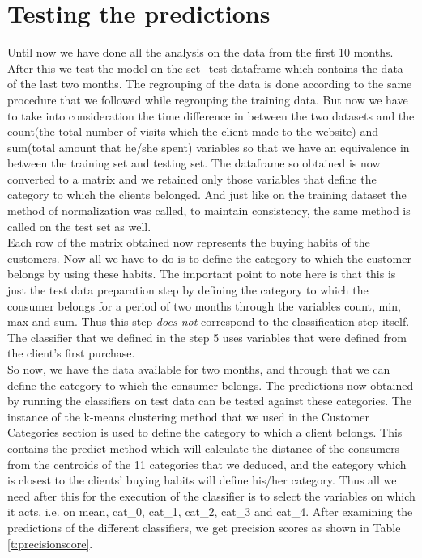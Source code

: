 \section{Testing the predictions}
Until now we have done all the analysis on the data from the first 10 months. After this we test the model on the set\_test dataframe which contains the data of the last two months. The regrouping of the data is done according to the same procedure that we followed while regrouping the training data. But now we have to take into consideration the time difference in between the two datasets and the count(the total number of visits which the client made to the website) and sum(total amount that he/she spent) variables so that we have an equivalence in between the training set and testing set. The dataframe so obtained is now converted to a matrix and we retained only those variables that define the category to which the clients belonged. And just like on the training dataset the method of normalization was called, to maintain consistency, the same method is called on the test set as well.\\
Each row of the matrix obtained now represents the buying habits of the customers. Now all we have to do is to define the category to which the customer belongs by using these habits. The important point to note here is that this is just the test data preparation step by defining the category to which the consumer belongs for a period of two months through the variables count, min, max and sum. Thus this step \emph{does not} correspond to the classification step itself. The classifier that we defined in the step 5 uses variables that were defined from the client's first purchase.\\
So now, we have the data available for two months, and through that we can define the category to which the consumer belongs. The predictions now obtained by running the classifiers on test data can be tested against these categories. The instance of the k-means clustering method that we used in the Customer Categories section is used to define the category to which a client belongs. This contains the predict method which will calculate the distance of the consumers from the centroids of the 11 categories that we deduced, and the category which is closest to the clients' buying habits will define his/her category. Thus all we need after this for the execution of the classifier is to select the variables on which it acts, i.e. on mean, cat\_0, cat\_1, cat\_2, cat\_3 and cat\_4. After examining the predictions of the different classifiers, we get precision scores as shown in Table \ref{t:precisionscore}.\\ 

